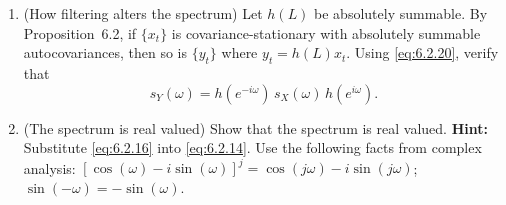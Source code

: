 \begin{enumerate}
\item (How filtering alters the spectrum) \; Let $h(L)$ be absolutely summable. By
Proposition~6.2, if $\{x_t\}$ is covariance-stationary with absolutely summable autocovariances,
then so is $\{y_t\}$ where $y_t = h(L) x_t$. Using \eqref{eq:6.2.20}, verify that
\[
  s_Y(\omega) = h(e^{-i\omega})\,s_X(\omega)\,h(e^{i\omega}).
\]

\item (The spectrum is real valued) \; Show that the spectrum is real valued. \textbf{Hint:}
Substitute \eqref{eq:6.2.16} into \eqref{eq:6.2.14}. Use the following facts from complex analysis:
$[\cos(\omega) - i\sin(\omega)]^j = \cos(j\omega) - i\sin(j\omega)$; $\sin(-\omega) = -\sin(\omega)$.
\end{enumerate}
